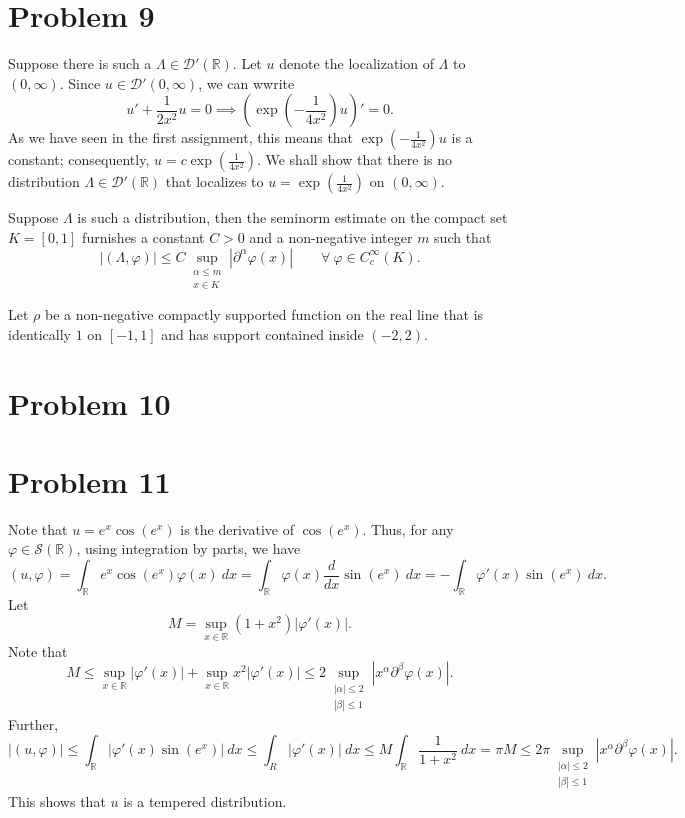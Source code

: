 \documentclass[10pt]{amsart}
\theoremstyle{thmstyle}
\theoremstyle{defstyle}
\newcommand{\R}{\mathbb{R}}
\newcommand{\scrS}{\mathscr S}
\renewcommand{\le}{\leqslant}
\begin{document}
\section{Problem 9}

Suppose there is such a $\Lambda\in\mathscr D'(\R)$. Let $u$ denote the localization of $\Lambda$ to $(0,\infty)$. Since $u\in\mathscr D'(0,\infty)$, we can wwrite 
\begin{equation*}
    u' + \frac{1}{2x^2}u = 0\implies \left(\exp\left(-\frac{1}{4x^2}\right)u\right)' = 0.
\end{equation*}
As we have seen in the first assignment, this means that $\exp\left(-\frac{1}{4x^2}\right)u$ is a constant; consequently, $u = c\exp\left(\frac{1}{4x^2}\right)$. We shall show that there is no distribution $\Lambda\in\mathscr D'(\R)$ that localizes to $u = \exp\left(\frac{1}{4x^2}\right)$ on $(0, \infty)$.

Suppose $\Lambda$ is such a distribution, then the seminorm estimate on the compact set $K = [0, 1]$ furnishes a constant $C > 0$ and a non-negative integer $m$ such that 
\begin{equation*}
    \left|(\Lambda,\varphi)\right|\le C\sup_{\substack{\alpha\le m\\ x\in K}}|\partial^\alpha\varphi(x)|\qquad\forall~\varphi\in C_c^\infty(K).
\end{equation*}

Let $\rho$ be a non-negative compactly supported function on the real line that is identically $1$ on $[-1, 1]$ and has support contained inside $(-2, 2)$.

\section{Problem 10}

\section{Problem 11}
Note that $u = e^x\cos(e^x)$ is the derivative of $\cos(e^x)$. Thus, for any $\varphi\in\scrS(\R)$, using integration by parts, we have 
\begin{equation*}
    (u,\varphi) = \int_{\R} e^x\cos (e^x)\varphi(x)~dx = \int_{\R}\varphi(x)\frac{d}{dx}\sin(e^x)~dx = - \int_{\R} \varphi'(x)\sin(e^x)~dx.
\end{equation*}
Let 
\begin{equation*}
    M = \sup_{x\in\R}(1 + x^2)|\varphi'(x)|.
\end{equation*}
Note that 
\begin{equation*}
    M\le \sup_{x\in\R} |\varphi'(x)| + \sup_{x\in\R} x^2|\varphi'(x)|\le 2\sup_{\substack{|\alpha|\le 2\\|\beta|\le 1}} |x^\alpha\partial^\beta\varphi(x)|.
\end{equation*}
Further, 
\begin{equation*}
    |(u,\varphi)|\le\int_{\R} |\varphi'(x)\sin(e^x)|~dx\le\int_R|\varphi'(x)|~dx\le M\int_{\R}\frac{1}{1 + x^2}~dx = \pi M\le 2\pi\sup_{\substack{|\alpha|\le 2\\|\beta|\le 1}} |x^\alpha\partial^\beta\varphi(x)|.
\end{equation*}
This shows that $u$ is a tempered distribution.
\end{document}
